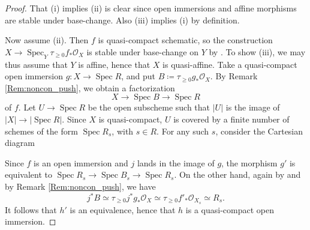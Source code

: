 \documentclass[a4paper,twoside,11pt]{amsart}
\theoremstyle{plain}
\theoremstyle{definition}
\theoremstyle{remark}
\numberwithin{equation}{section}
\DeclareMathOperator{\Spec}{Spec} %
\newcommand{\oO}{\mathcal{O}}
\begin{document}
\begin{proof}
    That (i) implies (ii)  is clear since open immersions and affine morphisms are stable under base-change. Also (iii) implies (i) by definition.
    
    Now assume (ii). Then $f$ is quasi-compact schematic, so the construction $X \to \Spec_Y \tau_{\geq 0} f_* \oO_X$ is stable under base-change on $Y$ by \cite[Ch.~2, Prop.~2.2.2]{GaitsgoryStudy}. To show (iii), we may thus assume that $Y$ is affine, hence that $X$ is quasi-affine. Take a quasi-compact open immersion $g \colon X \to \Spec R$, and put $B \coloneqq \tau_{\geq 0}g_*\oO_X$. By Remark \ref{Rem:noncon_push}, we obtain a factorization
    \[ X \to \Spec B \to \Spec R \]
    of $f$. Let $U \to \Spec R$ be the open subscheme such that $\lvert U \rvert$ is the image of $\lvert X \rvert \to \lvert \Spec R \rvert$. Since $X$ is quasi-compact, $U$ is covered by a finite number of schemes of the form $\Spec R_s$, with $s \in R$. For any such $s$, consider the Cartesian diagram
    \begin{center}
    \end{center}
    Since $f$ is an open immersion and $j$ lands in the image of $g$, the morphism $g'$ is equivalent to $\Spec R_s \to \Spec B_s \to \Spec R_s$. On the other hand, again by \cite[Ch.~2, Prop.~2.2.2]{GaitsgoryStudy} and by Remark \ref{Rem:noncon_push}, we have
    \[ j^*B \simeq \tau_{\geq 0} j^*g_* \oO_X \simeq \tau_{\geq 0} f'_*\oO_{X_s} \simeq R_s. \]
    It follows that $h'$ is an equivalence, hence that $h$ is a quasi-compact open immersion. 
    

\end{proof}
\end{document}
